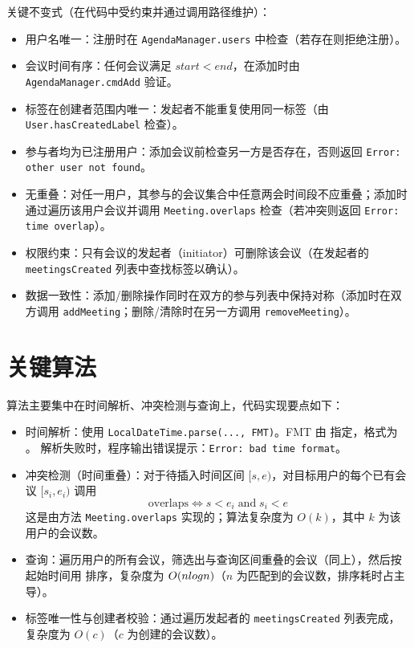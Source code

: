 关键不变式（在代码中受约束并通过调用路径维护）：
\begin{itemize}
  \item 用户名唯一：注册时在 \texttt{AgendaManager.users} 中检查（若存在则拒绝注册）。
  \item 会议时间有序：任何会议满足 \(start < end\)，在添加时由 \texttt{AgendaManager.cmdAdd} 验证。\newline
  \item 标签在创建者范围内唯一：发起者不能重复使用同一标签（由 \texttt{User.hasCreatedLabel} 检查）。
  \item 参与者均为已注册用户：添加会议前检查另一方是否存在，否则返回 \texttt{Error: other user not found}。
  \item 无重叠：对任一用户，其参与的会议集合中任意两会时间段不应重叠；添加时通过遍历该用户会议并调用 \texttt{Meeting.overlaps} 检查（若冲突则返回 \texttt{Error: time overlap}）。
  \item 权限约束：只有会议的发起者（initiator）可删除该会议（在发起者的 \texttt{meetingsCreated} 列表中查找标签以确认）。
  \item 数据一致性：添加/删除操作同时在双方的参与列表中保持对称（添加时在双方调用 \texttt{addMeeting}；删除/清除时在另一方调用 \texttt{removeMeeting}）。
\end{itemize}

\section{关键算法}

算法主要集中在时间解析、冲突检测与查询上，代码实现要点如下：
\begin{itemize}
  \item 时间解析：使用 \texttt{LocalDateTime.parse(..., FMT)}。FMT 由  指定，格式为 。
  解析失败时，程序输出错误提示：\texttt{Error: bad time format}。
  \item 冲突检测（时间重叠）：对于待插入时间区间 $[s,e)$，对目标用户的每个已有会议 $[s_i,e_i)$ 调用
  \begin{equation*}
    \text{overlaps} \iff s < e_i \; \text{and} \; s_i < e
  \end{equation*}
  这是由方法 \texttt{Meeting.overlaps} 实现的；算法复杂度为 $O(k)$，其中 $k$ 为该用户的会议数。
  \item 查询：遍历用户的所有会议，筛选出与查询区间重叠的会议（同上），然后按起始时间用  排序，复杂度为 $O(n\\log n)$（$n$ 为匹配到的会议数，排序耗时占主导）。
  \item 标签唯一性与创建者校验：通过遍历发起者的 \texttt{meetingsCreated} 列表完成，复杂度为 $O(c)$（$c$ 为创建的会议数）。
\end{itemize}

